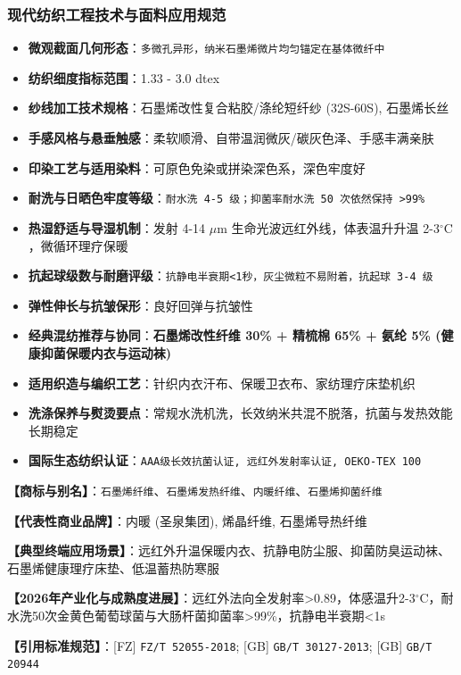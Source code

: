 \documentclass[11pt,openright,twoside,UTF8]{ctexbook}
\begin{document}
\subsubsection*{现代纺织工程技术与面料应用规范}
\begin{itemize} \setlength{\itemsep}{2pt}
    \item \textbf{微观截面几何形态}：\texttt{多微孔异形，纳米石墨烯微片均匀锚定在基体微纤中}
    \item \textbf{纺织细度指标范围}：1.33 - 3.0 dtex
    \item \textbf{纱线加工技术规格}：石墨烯改性复合粘胶/涤纶短纤纱 (32S-60S), 石墨烯长丝
    \item \textbf{手感风格与悬垂触感}：柔软顺滑、自带温润微灰/碳灰色泽、手感丰满亲肤
    \item \textbf{印染工艺与适用染料}：可原色免染或拼染深色系，深色牢度好
    \item \textbf{耐洗与日晒色牢度等级}：\texttt{耐水洗 4-5 级；抑菌率耐水洗 50 次依然保持 \textgreater{}99\%}
    \item \textbf{热湿舒适与导湿机制}：发射 4-14 $\mu$m 生命光波远红外线，体表温升升温 2-3$^\circ\mathrm{C}$，微循环理疗保暖
    \item \textbf{抗起球级数与耐磨评级}：\texttt{抗静电半衰期\textless{}1秒，灰尘微粒不易附着，抗起球 3-4 级}
    \item \textbf{弹性伸长与抗皱保形}：良好回弹与抗皱性
    \item \textbf{经典混纺推荐与协同}：\textbf{石墨烯改性纤维 30\% + 精梳棉 65\% + 氨纶 5\% (健康抑菌保暖内衣与运动袜)}
    \item \textbf{适用织造与编织工艺}：针织内衣汗布、保暖卫衣布、家纺理疗床垫机织
    \item \textbf{洗涤保养与熨烫要点}：常规水洗机洗，长效纳米共混不脱落，抗菌与发热效能长期稳定
    \item \textbf{国际生态纺织认证}：\texttt{AAA级长效抗菌认证, 远红外发射率认证, OEKO-TEX 100}
\end{itemize}
\vspace{0.2cm}

\noindent\textbf{【商标与别名】}：\texttt{石墨烯纤维}、\texttt{石墨烯发热纤维}、\texttt{内暖纤维}、\texttt{石墨烯抑菌纤维}\par
\noindent\textbf{【代表性商业品牌】}：内暖 (圣泉集团), 烯晶纤维, 石墨烯导热纤维\par
\noindent\textbf{【典型终端应用场景】}：远红外升温保暖内衣、抗静电防尘服、抑菌防臭运动袜、石墨烯健康理疗床垫、低温蓄热防寒服\par
\noindent\textbf{【2026年产业化与成熟度进展】}：远红外法向全发射率\textgreater{}0.89，体感温升2-3$^\circ\mathrm{C}$，耐水洗50次金黄色葡萄球菌与大肠杆菌抑菌率\textgreater{}99\%，抗静电半衰期\textless{}1s\par
\noindent\textbf{【引用标准规范】}：[FZ] \texttt{FZ/T 52055-2018}; [GB] \texttt{GB/T 30127-2013}; [GB] \texttt{GB/T 20944}\par
\vspace{0.5cm}
\end{document}
